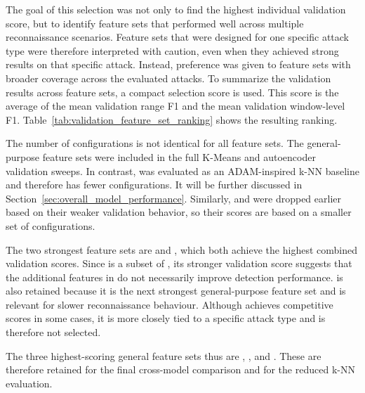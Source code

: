 The goal of this selection was not only to find the highest individual validation score, but to identify feature sets that performed well across multiple reconnaissance scenarios. Feature sets that were designed for one specific attack type were therefore interpreted with caution, even when they achieved strong results on that specific attack. Instead, preference was given to feature sets with broader coverage across the evaluated attacks. To summarize the validation results across feature sets, a compact selection score is used. This score is the average of the mean validation range F1 and the mean validation window-level F1. Table~\ref{tab:validation_feature_set_ranking} shows the resulting ranking. 


The number of configurations is not identical for all feature sets. The general-purpose feature sets were included in the full K-Means and autoencoder validation sweeps. In contrast,  was evaluated as an ADAM-inspired k-NN baseline and therefore has fewer configurations. It will be further discussed in Section~\ref{sec:overall_model_performance}. Similarly,  and  were dropped earlier based on their weaker validation behavior, so their scores are based on a smaller set of configurations. 

The two strongest feature sets are  and , which both achieve the highest combined validation scores. Since  is a subset of , its stronger validation score suggests that the additional features in  do not necessarily improve detection performance.
 is also retained because it is the next strongest general-purpose feature set and is relevant for slower reconnaissance behaviour. Although  achieves competitive scores in some cases, it is more closely tied to a specific attack type and is therefore not selected.

The three highest-scoring general feature sets thus are , , and . These are therefore retained for the final cross-model comparison and for the reduced k-NN evaluation.




